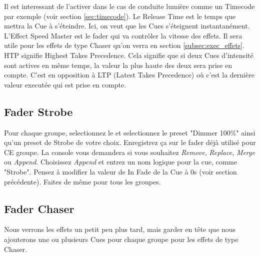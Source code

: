 Il est interessant de l'activer dans le cas de conduite lumière comme un Timecode par exemple (voir section \ref{sec:timecode}).
\newline
Le Release Time est le temps que mettra la Cue à s'éteindre. Ici, on veut que les Cues s'éteignent instantanément.
\newline
L'Effect Speed Master est le fader qui va contrôler la vitesse des effets. Il sera utile pour les effets de type Chaser qu'on verra en section \ref{subsec:exec_effets}.
\newline
HTP signifie Highest Takes Precedence. Cela signifie que si deux Cues d'intensité sont actives en même temps, la valeur la plus haute des deux sera prise en compte.
C'est en opposition à LTP (Latest Takes Precedence) où c'est la dernière valeur executée qui est prise en compte.

\subsection{Fader Strobe}
\label{subsec:fader_strobe}

Pour chaque groupe, selectionnez le et selectionnez le preset "Dimmer 100\%" ainsi qu'un preset de Strobe de votre choix.
Enregistrez ça sur le fader déjà utilisé pour CE groupe. La console vous demandera si vous souhaitez \textit{Remove}, \textit{Replace}, \textit{Merge} ou \textit{Append}.
Choisissez \textit{Append} et entrez un nom logique pour la cue, comme "Strobe".
\newline
Pensez à modifier la valeur de In Fade de la Cue à 0s (voir section précédente).
\newline
\newline
Faites de même pour tous les groupes.

\subsection{Fader Chaser}
\label{subsec:fader_chaser}

Nous verrons les effets un petit peu plus tard, mais garder en tête que nous ajouterons une ou plusieurs Cues pour chaque groupe pour les effets de type Chaser.
